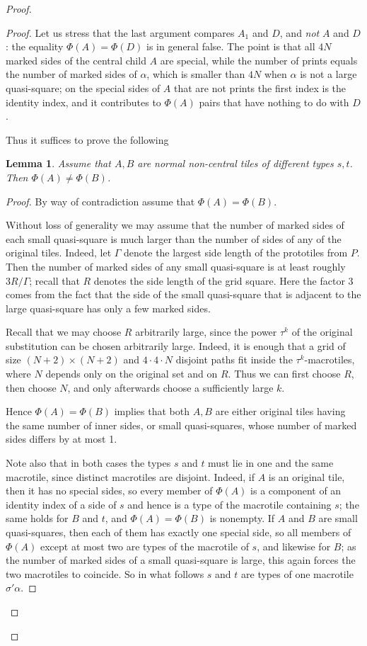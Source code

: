 \documentclass[12pt]{article}
\newtheorem{lemma}{Lemma}
\theoremstyle{remark}
\begin{document}
\begin{proof}
\begin{proof}
Let us stress that the last argument compares $A_1$ and $D$, and \emph{not} $A$ and $D$:
the equality $\Phi(A)=\Phi(D)$ is in general false. The point is that all $4N$ marked sides of the
central child $A$ are special, while the number of prints equals the number of marked sides of
$\alpha$, which is smaller than $4N$ when $\alpha$ is not a large quasi-square; on the special
sides of $A$ that are not prints the first index is the identity index, and it contributes to
$\Phi(A)$ pairs that have nothing to do with $D$.

Thus it suffices to prove the following

\begin{lemma}\label{l8}
Assume that $A,B$ are normal non-central tiles of different types $s,t$. Then $\Phi(A)\ne \Phi(B)$. 
\end{lemma}
\begin{proof}
By way of contradiction assume that $\Phi(A)= \Phi(B)$. 

Without loss of generality we may assume that the number of marked sides of each small quasi-square 
is much larger than the number of sides of any of the original tiles.
Indeed,  let $\Gamma$
denote the largest side length of the prototiles from $P$.
Then the number of marked sides of any small quasi-square is at least roughly $3R/\Gamma$; recall that $R$ denotes
the side length of the grid square. %
Here the factor 3 comes from the fact that 
the side of the small quasi-square that is adjacent to the large quasi-square has only a few marked sides.

Recall that we may choose $R$ arbitrarily large, since
the power $\tau^k$ of the original substitution can be chosen arbitrarily
large. Indeed, it is enough that a grid of size $(N+2)\times (N+2)$ and $4\cdot4\cdot N$ disjoint paths fit inside the
$\tau^k$-macrotiles, where $N$ depends only on the original set and on $R$. Thus
we can first choose $R$, then choose $N$, and only afterwards choose a
sufficiently large $k$.

Hence $\Phi(A)=\Phi(B)$ implies that both $A,B$ are either original tiles having the same number of inner sides,
or small quasi-squares, whose number of marked sides differs by at most 1.

Note also that in both cases the types $s$ and $t$ must lie in one and the same macrotile, since
distinct macrotiles are disjoint. Indeed, if $A$ is an original tile, then it has no special sides,
so every member of $\Phi(A)$ is a component of an identity index of a side of $s$ and hence is a
type of the macrotile containing $s$; the same holds for $B$ and $t$, and $\Phi(A)=\Phi(B)$ is
nonempty. If $A$ and $B$ are small quasi-squares, then each of them has exactly one special side,
so all members of $\Phi(A)$ except at most two are types of the macrotile of $s$, and likewise for
$B$; as the number of marked sides of a small quasi-square is large, this again forces the two
macrotiles to coincide. So in what follows $s$ and $t$ are types of one macrotile $\sigma'\alpha$.


\end{proof}
\end{proof}
\end{proof}
\end{document}

